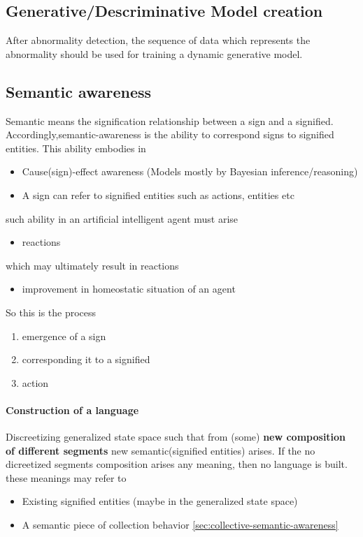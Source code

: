 \documentclass{article}
\begin{document}
		\subsection{Generative/Descriminative  Model creation}
			After abnormality detection, the sequence of data which represents the abnormality should be used for training a dynamic generative model. 

		\subsection{Semantic awareness}
		Semantic means the signification relationship between a sign and a signified. Accordingly,semantic-awareness is the ability to correspond signs to signified entities. This ability embodies in 
			\begin{itemize}
				\item Cause(sign)-effect awareness (Models mostly by Bayesian inference/reasoning)
				\item A sign can refer to signified entities such as actions, entities etc 
			\end{itemize}
			such ability in an artificial intelligent agent must arise 
			\begin{itemize}
				\item reactions
			\end{itemize}
			which may ultimately result in reactions
			\begin{itemize}
				\item improvement in homeostatic situation of an agent 
			\end{itemize} 
			So this is the process
			\begin{enumerate}
				\item emergence of a sign
				\item corresponding it to a signified
				\item action
			\end{enumerate}
			
			\paragraph{Construction of a language} Discreetizing generalized state space such that from (some) \textbf{new composition of different segments} new semantic(signified entities) arises. If the no dicreetized segments composition arises any meaning, then no language is built. these meanings may refer to
			\begin{itemize}
				\item Existing signified entities (maybe in the generalized state space)
				\item A semantic piece of collection behavior \ref{sec:collective-semantic-awareness} 
			\end{itemize}
		
\end{document}
